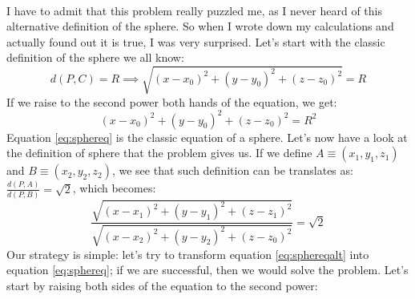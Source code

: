 \paragraph{}
I have to admit that this problem really puzzled me, as I never heard of this alternative
definition of the sphere. So when I wrote down my calculations and actually found out it
is true, I was very surprised. Let's start with the classic
definition of
the sphere we all know:
\begin{equation*}
    d(P,C) = R \implies \sqrt{(x-x_0)^2 + (y-y_0)^2 + (z-z_0)^2} = R
\end{equation*}
If we raise to the second power both hands of the equation, we get:
\begin{equation}\label{eq:sphereq}
    (x-x_0)^2 + (y-y_0)^2 + (z-z_0)^2 = R^2
\end{equation}
Equation \ref{eq:sphereq} is the classic equation of a sphere.
Let's now have a look at the definition of sphere that the problem gives us.
If we define $A \equiv(x_1,y_1,z_1)$ and $B \equiv(x_2,y_2,z_2)$, we see that
such definition can be translates as: $\frac{d(P,A)}{d(P,B)} = \sqrt{2}$, which
becomes:
\begin{equation}\label{eq:sphereqalt}
    \frac{\sqrt{(x-x_1)^2 + (y-y_1)^2 + (z-z_1)^2}}{\sqrt{(x-x_2)^2 + (y-y_2)^2 + (z-z_0)^2}} = \sqrt{2}
\end{equation} 
Our strategy is simple: let's try to transform equation \ref{eq:sphereqalt}
into equation \ref{eq:sphereq}; if we are successful, then we would solve the problem.
Let's start by raising both sides of the equation to the second power:
